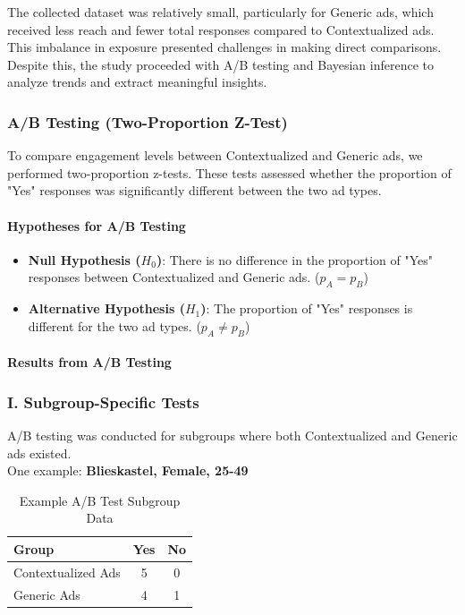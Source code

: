 \documentclass[a4paper,11pt]{article}
\begin{document}
The collected dataset was relatively small, particularly for Generic ads, which received less reach and fewer total responses compared to Contextualized ads. This imbalance in exposure presented challenges in making direct comparisons. Despite this, the study proceeded with A/B testing and Bayesian inference to analyze trends and extract meaningful insights.


\subsubsection{A/B Testing (Two-Proportion Z-Test)}
To compare engagement levels between Contextualized and Generic ads, we performed two-proportion z-tests. These tests assessed whether the proportion of "Yes" responses was significantly different between the two ad types.


\paragraph{Hypotheses for A/B Testing}
\begin{itemize}
    \item \textbf{Null Hypothesis (\(H_0\))}: There is no difference in the proportion of "Yes" responses between Contextualized and Generic ads. (\( p_A = p_B \))
    \item \textbf{Alternative Hypothesis (\(H_1\))}: The proportion of "Yes" responses is different for the two ad types. (\( p_A \neq p_B \))
\end{itemize}


\paragraph{Results from A/B Testing} 


\subsubsection*{I. Subgroup-Specific Tests}
A/B testing was conducted for subgroups where both Contextualized and Generic ads existed. \\
One example: \textbf{Blieskastel, Female, 25-49}

\begin{table}[H]
\centering
\begin{tabular}{|l|c|c|}
    \hline
    \textbf{Group} & \textbf{Yes} & \textbf{No} \\ \hline
    Contextualized Ads  & 5 & 0 \\ \hline
    Generic Ads & 4 & 1 \\ \hline
\end{tabular}
\caption{Example A/B Test Subgroup Data}
\end{table}
\end{document}
